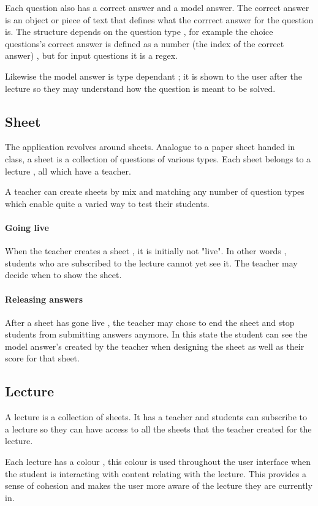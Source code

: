 Each question also has a correct answer and a model answer. The correct answer is an object or piece of text that defines what the corrrect answer for the question is. The structure depends on the question type , for example the choice questions's correct answer is defined as a number (the index of the correct answer) , but for input questions it is a regex.

Likewise the model answer is type dependant ; it is shown to the user after the lecture so they may understand how the question is meant to be solved.


\subsection{Sheet}
The application revolves around sheets. Analogue to a paper sheet handed in class, a sheet is a collection of questions of various types. Each sheet belongs to a lecture , all which have a teacher.


A teacher can create sheets by mix and matching any number of question types which enable quite a varied way to test their students.

\paragraph{Going live} When the teacher creates a sheet , it is initially not "live". In other words , students who are subscribed to the lecture cannot yet see it. The teacher may decide when to show the sheet.

\paragraph{Releasing answers} After a sheet has gone live , the teacher may chose to end the sheet and stop students from submitting answers anymore. In this state the student can see the model answer's created by the teacher when designing the sheet as well as their score for that sheet.

\subsection{Lecture}
A lecture is a collection of sheets. It has a teacher and students can subscribe to a lecture so they can have access to all the sheets that the teacher created for the lecture.

Each lecture has a colour , this colour is used throughout the user interface when the student is interacting with content relating with the lecture. This provides a sense of cohesion and makes the user more aware of the lecture they are currently in.


